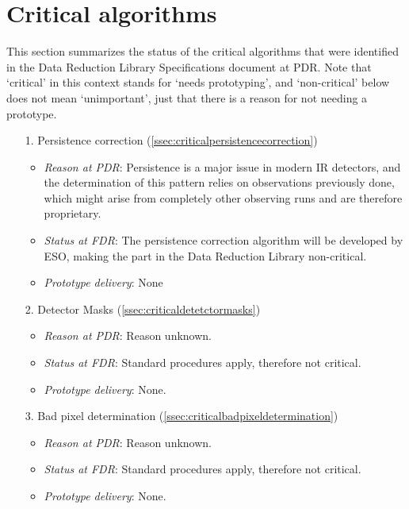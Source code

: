 \clearpage
\section{Critical algorithms}\label{sec:critical_algorithms}

This section summarizes the status of the critical algorithms that were identified in the Data Reduction Library Specifications document \cite{DRLS} at PDR. Note that `critical' in this context stands for `needs prototyping', and `non-critical' below does not mean `unimportant', just that there is a reason for not needing a prototype.

\begin{enumerate}
    \item[1.] Persistence correction (\ref{ssec:criticalpersistencecorrection})
    \begin{itemize}
        \item \textit{Reason at PDR}: Persistence is a major issue in modern IR detectors, and the determination of this pattern relies on observations previously done, which might arise from completely other observing runs and are therefore proprietary.
        \item \textit{Status at FDR}: The persistence correction algorithm will be developed by ESO, making the part in the Data Reduction Library non-critical.
        \item \textit{Prototype delivery}: None
    \end{itemize}
    \item[2.] Detector Masks (\ref{ssec:criticaldetetctormasks})
    \begin{itemize}
        \item \textit{Reason at PDR}: Reason unknown.
        \item \textit{Status at FDR}: Standard procedures apply, therefore not critical.
        \item \textit{Prototype delivery}: None.
    \end{itemize}
    \item[3.] Bad pixel determination (\ref{ssec:criticalbadpixeldetermination})
    \begin{itemize}
        \item \textit{Reason at PDR}: Reason unknown.
        \item \textit{Status at FDR}: Standard procedures apply, therefore not critical.
        \item \textit{Prototype delivery}: None.
    \end{itemize}

\end{enumerate}
